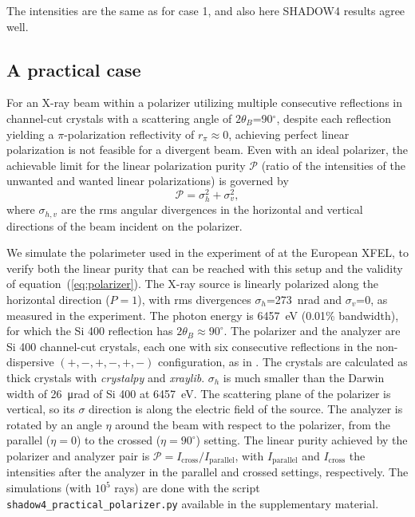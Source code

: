 \documentclass{iucr}
\begin{document}
The intensities are the same as for case 1, and also here SHADOW4 results agree well. 

\subsection{A practical case}\label{sec:polarizers45degPractical}

For an X-ray beam within a polarizer utilizing multiple consecutive reflections in channel-cut crystals with a scattering angle of $2\theta_B$=90$^\circ$, despite each reflection yielding a $\pi$-polarization reflectivity of $r_\pi\approx 0$, achieving perfect linear polarization is not feasible for a divergent beam.
Even with an ideal polarizer, the achievable limit for the linear polarization purity $\mathcal{P}$ (ratio of the intensities of the unwanted and wanted linear polarizations) is governed by \cite{Schulze2018}
\begin{equation}\label{eq:polarizer}
    \mathcal{P} = \sigma_h^2 + \sigma_v^2,
\end{equation}
where $\sigma_{h,v}$ are the rms angular divergences in the horizontal and vertical directions of the beam incident on the polarizer.

We simulate the polarimeter used in the experiment of \cite{Schulze2022} at the European XFEL, to verify both the linear purity that can be reached with this setup and the validity of equation~(\ref{eq:polarizer}).
The X-ray source is linearly polarized along the horizontal direction ($P=1$), with rms divergences $\sigma_h$=\SI{273}{\nano\radian} and $\sigma_v$=0, as measured in the experiment.
The photon energy is \SI{6457}{eV} (0.01\% bandwidth), for which the Si 400 reflection has $2\theta_B\approx 90^\circ$.
The polarizer and the analyzer are Si 400 channel-cut crystals, each one with six consecutive reflections in the non-dispersive $(+,-,+,-,+,-)$ configuration, as in \cite{Schulze2022}.
The crystals are calculated as thick crystals with {\it crystalpy} and {\it xraylib}.
$\sigma_h$ is much smaller than the Darwin width of \SI{26}{\micro\radian} of Si 400 at \SI{6457}{eV}.
The scattering plane of the polarizer is vertical, so its $\sigma$ direction is along the electric field of the source. The analyzer is rotated by an angle $\eta$ around the beam with respect to the polarizer, from the parallel ($\eta=0$) to the crossed ($\eta=90^\circ$) setting.
The linear purity achieved by the polarizer and analyzer pair is $\mathcal{P}=I_\text{cross}/I_\text{parallel}$, with $I_\text{parallel}$ and $I_\text{cross}$ the intensities after the analyzer in the parallel and crossed settings, respectively.
The simulations (with $10^5$ rays) are done with the script {\tt shadow4\_practical\_polarizer.py} available in the supplementary material.
\end{document}
